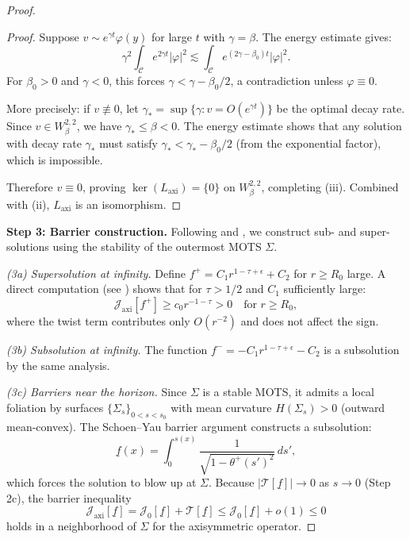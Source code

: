 \documentclass[12pt]{article}
\theoremstyle{plain}
\theoremstyle{definition}
\theoremstyle{remark}
\begin{document}
\begin{proof}
\begin{proof}
Suppose $v \sim e^{\gamma t} \varphi(y)$ for large $t$ with $\gamma = \beta$. The energy estimate gives:
\[
\gamma^2 \int_{\mathcal{C}} e^{2\gamma t} |\varphi|^2 \lesssim \int_{\mathcal{C}} e^{(2\gamma - \beta_0) t} |\varphi|^2.
\]
For $\beta_0 > 0$ and $\gamma < 0$, this forces $\gamma < \gamma - \beta_0/2$, a contradiction unless $\varphi \equiv 0$.

More precisely: if $v \not\equiv 0$, let $\gamma_* = \sup\{\gamma : v = O(e^{\gamma t})\}$ be the optimal decay rate. Since $v \in W^{2,2}_\beta$, we have $\gamma_* \leq \beta < 0$. The energy estimate shows that any solution with decay rate $\gamma_*$ must satisfy $\gamma_* < \gamma_* - \beta_0/2$ (from the exponential factor), which is impossible.

Therefore $v \equiv 0$, proving $\ker(L_{\mathrm{axi}}) = \{0\}$ on $W^{2,2}_\beta$, completing (iii). Combined with (ii), $L_{\mathrm{axi}}$ is an isomorphism.
\end{proof}

\textbf{Step 3: Barrier construction.}
Following \cite{hankhuri2013} and \cite{schoen1981}, we construct sub- and super-solutions using the stability of the outermost MOTS $\Sigma$.

\textit{(3a) Supersolution at infinity.} Define $f^+ = C_1 r^{1-\tau+\epsilon} + C_2$ for $r \geq R_0$ large. A direct computation (see \cite[Section 4]{hankhuri2013}) shows that for $\tau > 1/2$ and $C_1$ sufficiently large:
\[
\mathcal{J}_{\text{axi}}[f^+] \geq c_0 r^{-1-\tau} > 0 \quad \text{for } r \geq R_0,
\]
where the twist term contributes only $O(r^{-2})$ and does not affect the sign.

\textit{(3b) Subsolution at infinity.} The function $f^- = -C_1 r^{1-\tau+\epsilon} - C_2$ is a subsolution by the same analysis.

\textit{(3c) Barriers near the horizon.} Since $\Sigma$ is a stable MOTS, it admits a local foliation by surfaces $\{\Sigma_s\}_{0 < s < s_0}$ with mean curvature $H(\Sigma_s) > 0$ (outward mean-convex). The Schoen--Yau barrier argument \cite{schoen1981} constructs a subsolution:
\[
\underline{f}(x) = \int_0^{s(x)} \frac{1}{\sqrt{1 - \theta^+(s')^2}} \, ds',
\]
which forces the solution to blow up at $\Sigma$. Because $|\mathcal{T}[\underline{f}]| \to 0$ as $s \to 0$ (Step 2c), the barrier inequality
\[
\mathcal{J}_{\text{axi}}[\underline{f}] = \mathcal{J}_0[\underline{f}] + \mathcal{T}[\underline{f}] \leq \mathcal{J}_0[\underline{f}] + o(1) \leq 0
\]
holds in a neighborhood of $\Sigma$ for the axisymmetric operator.


\end{proof}
\end{document}
